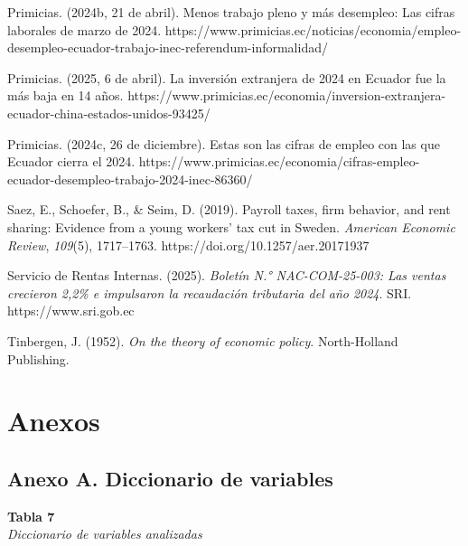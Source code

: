\documentclass[12pt,spanish]{article}
\begin{document}
Primicias. (2024b, 21 de abril). Menos trabajo pleno y más desempleo:
Las cifras laborales de marzo de 2024.
https://www.primicias.ec/noticias/economia/empleo-desempleo-ecuador-trabajo-inec-referendum-informalidad/

Primicias. (2025, 6 de abril). La inversión extranjera de 2024 en
Ecuador fue la más baja en 14 años.
https://www.primicias.ec/economia/inversion-extranjera-ecuador-china-estados-unidos-93425/

Primicias. (2024c, 26 de diciembre). Estas son las cifras de empleo con
las que Ecuador cierra el 2024.
https://www.primicias.ec/economia/cifras-empleo-ecuador-desempleo-trabajo-2024-inec-86360/

Saez, E., Schoefer, B., \& Seim, D. (2019). Payroll taxes, firm
behavior, and rent sharing: Evidence from a young workers' tax cut in
Sweden. \emph{American Economic Review}, \emph{109}(5), 1717--1763.
https://doi.org/10.1257/aer.20171937

Servicio de Rentas Internas. (2025). \emph{Boletín N.° NAC-COM-25-003:
Las ventas crecieron 2,2\% e impulsaron la recaudación tributaria del
año 2024}. SRI. https://www.sri.gob.ec

Tinbergen, J. (1952). \emph{On the theory of economic policy}.
North-Holland Publishing.

\endgroup

\section*{Anexos}\label{anexos}

\subsection{Anexo A. Diccionario de
variables}\label{anexo-a.-diccionario-de-variables}

\textbf{Tabla 7}\\
\emph{Diccionario de variables analizadas}
\end{document}
